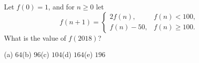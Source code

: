 Let $f(0)=1$, and for $n\ge0$ let
\[
f(n+1)=\begin{cases}2f(n),&f(n)<100,\\ f(n)-50,&f(n)\ge100.\end{cases}
\]
What is the value of $f(2018)$?

(a) $64$\quad (b) $96$\quad (c) $104$\quad (d) $164$\quad (e) $196$
